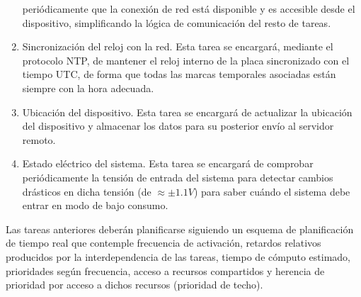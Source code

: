 \begin{enumerate}
        periódicamente que la conexión de red está disponible y es accesible desde
        el dispositivo, simplificando la lógica de comunicación del resto de tareas.
  \item Sincronización del reloj con la red. Esta tarea se encargará, mediante el
        protocolo \ac{NTP}, de mantener el reloj interno de la placa sincronizado con el
        tiempo \ac{UTC}, de forma que todas las marcas temporales asociadas están siempre
        con la hora adecuada.
  \item Ubicación del dispositivo. Esta tarea se encargará de actualizar la ubicación
        del dispositivo y almacenar los datos para su posterior envío al servidor remoto.
  \item Estado eléctrico del sistema. Esta tarea se encargará de comprobar periódicamente
        la tensión de entrada del sistema para detectar cambios drásticos en dicha
        tensión (de $\approx \pm 1.1V$) para saber cuándo el sistema debe entrar en
        modo de bajo consumo.
\end{enumerate}

Las tareas anteriores deberán planificarse siguiendo un esquema de planificación de
tiempo real que contemple frecuencia de activación, retardos relativos producidos
por la interdependencia de las tareas, tiempo de cómputo estimado, prioridades
según frecuencia, acceso a recursos compartidos y herencia de prioridad por acceso
a dichos recursos (prioridad de techo).
